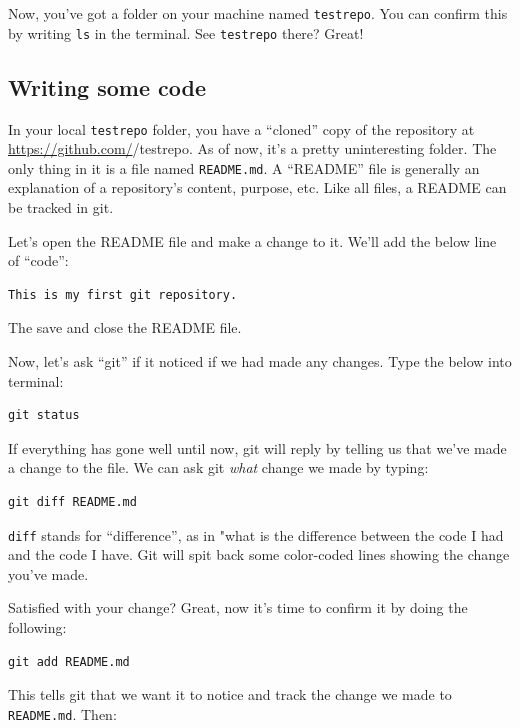\documentclass[
]{book}
\begin{document}
Now, you've got a folder on your machine named \texttt{testrepo}. You can confirm this by writing \texttt{ls} in the terminal.
See \texttt{testrepo} there? Great!

\hypertarget{writing-some-code}{%
\subsection*{Writing some code}\label{writing-some-code}}

In your local \texttt{testrepo} folder, you have a ``cloned'' copy of the repository at \url{https://github.com/}/testrepo. As of now, it's a pretty uninteresting folder. The only thing in it is a file named \texttt{README.md}. A ``README'' file is generally an explanation of a repository's content, purpose, etc. Like all files, a README can be tracked in git.

Let's open the README file and make a change to it. We'll add the below line of ``code'':

\begin{verbatim}
This is my first git repository.
\end{verbatim}

The save and close the README file.

Now, let's ask ``git'' if it noticed if we had made any changes. Type the below into terminal:

\begin{verbatim}
git status
\end{verbatim}

If everything has gone well until now, git will reply by telling us that we've made a change to the file. We can ask git \emph{what} change we made by typing:

\begin{verbatim}
git diff README.md
\end{verbatim}

\texttt{diff} stands for ``difference'', as in "what is the difference between the code I had and the code I have. Git will spit back some color-coded lines showing the change you've made.

Satisfied with your change? Great, now it's time to confirm it by doing the following:

\begin{verbatim}
git add README.md
\end{verbatim}

This tells git that we want it to notice and track the change we made to \texttt{README.md}. Then:
\end{document}
